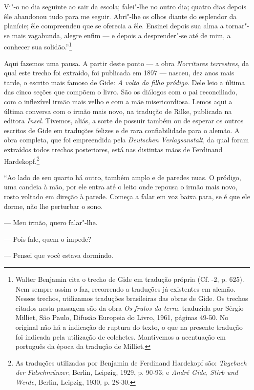 Vi"-o no dia seguinte ao sair da escola; falei"-lhe no outro dia; quatro
dias depois êle abandonou tudo para me seguir. Abri"-lhe os olhos diante
do esplendor da planície; êle compreendeu que se oferecia a êle. Ensinei
depois sua alma a tornar"-se mais vagabunda, alegre enfim --- e depois a
desprender"-se até de mim, a conhecer sua solidão.''\footnote{Walter Benjamin cita o trecho de Gide em tradução própria (Cf. -2, p. 625). Nem sempre assim o faz, recorrendo a traduções já
  existentes em alemão. Nesses trechos, utilizamos traduções brasileiras
  das obras de Gide. Os trechos citados nesta passagem são da obra
  \emph{Os frutos da terra}, traduzida por Sérgio Milliet, São Paulo,
  Difusão Europeia do Livro, 1961, páginas 49-50. No original não há a
  indicação de ruptura do texto, o que na presente tradução foi indicada
  pela utilização de colchetes. Mantivemos a acentuação em português da
  época da tradução de Milliet. \versal{[N. T.]}}

Aqui fazemos uma pausa. A partir deste ponto --- a obra \emph{Norritures
terrestres}, da qual este trecho foi extraído, foi publicada em 1897 ---
nasceu, dez anos mais tarde, o escrito mais famoso de Gide: \emph{A
volta do filho pródigo}. Dele leio a última das cinco seções que compõem
o livro. São os diálogos com o pai reconciliado, com o inflexível irmão
mais velho e com a mãe misericordiosa. Lemos aqui a última
conversa com o irmão mais novo, na tradução de Rilke, publicada na
editora \emph{Insel}. Tivemos, aliás, a sorte de possuir também ou de
esperar os outros escritos de Gide em traduções felizes e de rara
confiabilidade para o alemão. A obra completa, que foi empreendida pela
\emph{Deutschen Verlagsanstalt}, da qual foram extraídos todos trechos
posteriores, está nas distintas mãos de Ferdinand Hardekopf.\footnote{As traduções utilizadas por Benjamin de Ferdinand Hardekopf são:
  \emph{Tagebuch der Falschmünzer}, Berlin, Leipzig, 1929, p. 90-93; e
  \emph{André Gide, Stirb und Werde}, Berlin, Leipzig, 1930, p. 28-30. \versal{[N. T.]}}

``Ao lado de seu quarto há outro, também amplo e de paredes nuas. O
pródigo, uma candeia à mão, por ele entra até o leito onde repousa o
irmão mais novo, rosto voltado em direção à parede. Começa a falar em
voz baixa para, se é que ele dorme, não lhe perturbar o sono.

--- Meu irmão, quero falar"-lhe.

--- Pois fale, quem o impede?

--- Pensei que você estava dormindo.

